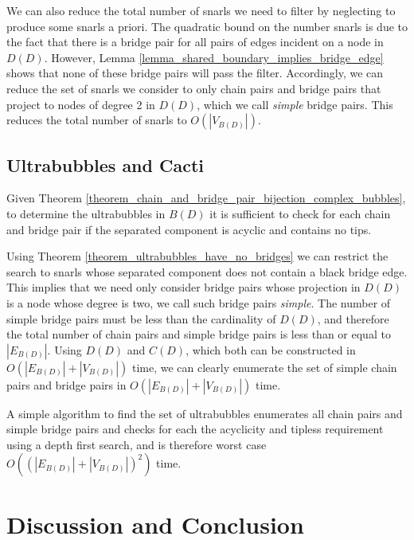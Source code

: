 \documentclass[11pt]{ucthesis}
\begin{document}
 We can also reduce the total number of snarls we need to filter by neglecting to produce some snarls a priori. The quadratic bound on the number snarls is due to the fact that there is a bridge pair for all pairs of edges incident on a  node in $D(D)$. However, Lemma \ref{lemma_shared_boundary_implies_bridge_edge} shows that none of these bridge pairs will pass the filter. Accordingly, we can reduce the set of snarls we consider to only chain pairs and bridge pairs that project to nodes of degree 2 in $D(D)$, which we call \emph{simple} bridge pairs. This reduces the total number of snarls to $O(|V_{B(D)}|)$.

\subsection{Ultrabubbles and Cacti}


Given Theorem \ref{theorem_chain_and_bridge_pair_bijection_complex_bubbles}, to determine the ultrabubbles in $B(D)$ it is sufficient to check for each chain and bridge pair if the separated component is acyclic and contains no tips. 

Using Theorem \ref{theorem_ultrabubbles_have_no_bridges} we can restrict the search to snarls whose separated component does not contain a black bridge edge. This implies that we need only consider bridge pairs whose projection in $D(D)$ is a node whose degree is two, we call such bridge pairs \emph{simple}. The number of simple bridge pairs must be less than the cardinality of $D(D)$, and therefore the total number of chain pairs and simple bridge pairs is less than or equal to $|E_{B(D)}|$.  Using $D(D)$ and $C(D)$, which both can be constructed in $O(|E_{B(D)}| + |V_{B(D)}|)$ time, we can clearly enumerate the set of simple chain pairs and bridge pairs in $O(|E_{B(D)}| + |V_{B(D)}|)$ time. 

A simple algorithm to find the set of ultrabubbles enumerates all chain pairs and simple bridge pairs and checks for each the acyclicity and tipless requirement using a depth first search, and is therefore worst case $O((|E_{B(D)}| + |V_{B(D)}|)^2)$ time.

\section{Discussion and Conclusion}

\end{document}
